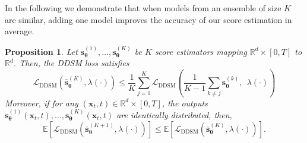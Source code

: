 \documentclass[10pt]{article} %
\newcommand{\DDSM}{\text{DDSM}}
\newtheorem{proposition}{Proposition}[section]
\def\rvx{{\mathbf{x}}}
\def\vtheta{{\bm{\theta}}}
\def\vs{{\bm{s}}}
\newcommand{\R}{\mathbb{R}}
\begin{document}
In the following we demonstrate that when models from an ensemble of size $K$ are similar, adding one model improves the accuracy of our score estimation in average.

\begin{proposition}\label{proposition: ensemble monotonicity score loss}
Let $\vs^{(1)}_\vtheta,\dots,\vs^{(K)}_\vtheta$ be $K$ score estimators mapping $\R^d \times [0,T]$ to $\R^d$. Then, the DDSM loss satisfies
\begin{equation}
\mathcal{L}_\DDSM(\overline{\vs}_\vtheta^{(K)},\lambda(\cdot)) \leq \frac{1}{K} \sum_{j=1}^K \mathcal{L}_\DDSM\left(\frac{1}{K-1} \sum_{k \neq j} \vs_\vtheta^{(k)},\:\:\lambda(\cdot)\right)
\end{equation}
Moreover, if for any $(\rvx_t,t) \in \R^d \times [0,T]$, the outputs $\vs^{(1)}_\vtheta(\rvx_t,t), \dots, \vs_\vtheta^{(K)}(\rvx_t,t) $ are identically distributed, then, 
\begin{equation}
\mathbb{E} \left[\mathcal{L}_{\DDSM}(\overline{\vs}_\vtheta^{(K+1)},\lambda(\cdot)) \right] \leq \mathbb{E}\left[\mathcal{L}_{\DDSM}(\overline{\vs}_\vtheta^{(K)},\lambda(\cdot)) \right].
\end{equation}
\end{proposition}
\end{document}
